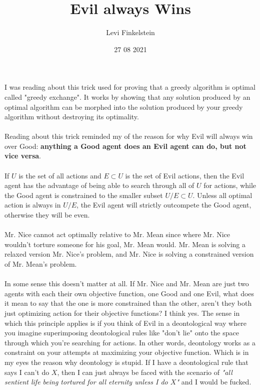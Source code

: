 \usepackage{pgfplots}
\title{Evil always Wins}
\author{Levi Finkelstein}
\date{27 08 2021}

\maketitle

I was reading about this trick used for proving that a greedy algorithm is optimal called "greedy exchange". It works by showing that any solution produced by an optimal algorithm can be morphed into the solution produced by your greedy algorithm without destroying its optimality.
\\\\
Reading about this trick reminded my of the reason for why Evil will always win over Good: \textbf{anything a Good agent does an Evil agent can do, but not vice versa}.
\\\\
If $U$ is the set of all actions and $E\subset U$ is the set of Evil actions, then the Evil agent has the advantage of being able to search through all of $U$ for actions, while the Good agent is constrained to the smaller subset $U/E\subset U$. Unless all optimal action is always in $U/E$, the Evil agent will strictly outcompete the Good agent, otherwise they will be even.
\\\\
Mr. Nice cannot act optimally relative to Mr. Mean since where Mr. Nice wouldn't torture someone for his goal, Mr. Mean would. Mr. Mean is solving a relaxed version Mr. Nice's problem, and Mr. Nice is solving a constrained version of Mr. Mean's problem.
\\\\
In some sense this doesn't matter at all. If Mr. Nice and Mr. Mean are just two agents with each their own objective function, one Good and one Evil, what does it mean to say that the one is more constrained than the other, aren't they both just optimizing action for their objective functions? I think yes. The sense in which this principle applies is if you think of Evil in a deontological way where you imagine superimposing deontological rules like "don't lie" onto the space through which you're searching for actions. In other words, deontology works as a constraint on your attempts at maximizing your objective function. Which is in my eyes the reason why deontology is stupid. If I have a deontological rule that says I can't do $X$, then I can just always be faced with the scenario of \textit{"all sentient life being tortured for all eternity unless I do $X$"} and I would be fucked.
